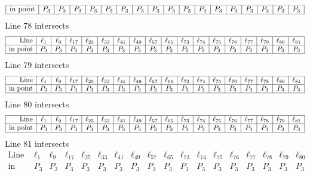 \documentclass{article}
\begin{document}
{$$\begin{array}{|r*{17}{|c}|}
\hline
\mbox{in point}  & P_{3} & P_{3} & P_{3} & P_{3} & P_{3} & P_{3} & P_{3} & P_{3} & P_{3} & P_{3} & P_{3} & P_{3} & P_{3} & P_{3} & P_{3} & P_{3} & P_{3}\\
\hline
\end{array}
$$
Line 78 intersects 
$$
\begin{array}{|r*{17}{|c}|}
\hline
\mbox{Line}  & \ell_{1} & \ell_{9} & \ell_{17} & \ell_{25} & \ell_{33} & \ell_{41} & \ell_{49} & \ell_{57} & \ell_{65} & \ell_{73} & \ell_{74} & \ell_{75} & \ell_{76} & \ell_{77} & \ell_{79} & \ell_{80} & \ell_{81}\\
\hline
\mbox{in point}  & P_{3} & P_{3} & P_{3} & P_{3} & P_{3} & P_{3} & P_{3} & P_{3} & P_{3} & P_{3} & P_{3} & P_{3} & P_{3} & P_{3} & P_{3} & P_{3} & P_{3}\\
\hline
\end{array}
$$
Line 79 intersects 
$$
\begin{array}{|r*{17}{|c}|}
\hline
\mbox{Line}  & \ell_{1} & \ell_{9} & \ell_{17} & \ell_{25} & \ell_{33} & \ell_{41} & \ell_{49} & \ell_{57} & \ell_{65} & \ell_{73} & \ell_{74} & \ell_{75} & \ell_{76} & \ell_{77} & \ell_{78} & \ell_{80} & \ell_{81}\\
\hline
\mbox{in point}  & P_{3} & P_{3} & P_{3} & P_{3} & P_{3} & P_{3} & P_{3} & P_{3} & P_{3} & P_{3} & P_{3} & P_{3} & P_{3} & P_{3} & P_{3} & P_{3} & P_{3}\\
\hline
\end{array}
$$
Line 80 intersects 
$$
\begin{array}{|r*{17}{|c}|}
\hline
\mbox{Line}  & \ell_{1} & \ell_{9} & \ell_{17} & \ell_{25} & \ell_{33} & \ell_{41} & \ell_{49} & \ell_{57} & \ell_{65} & \ell_{73} & \ell_{74} & \ell_{75} & \ell_{76} & \ell_{77} & \ell_{78} & \ell_{79} & \ell_{81}\\
\hline
\mbox{in point}  & P_{3} & P_{3} & P_{3} & P_{3} & P_{3} & P_{3} & P_{3} & P_{3} & P_{3} & P_{3} & P_{3} & P_{3} & P_{3} & P_{3} & P_{3} & P_{3} & P_{3}\\
\hline
\end{array}
$$
Line 81 intersects 
$$
\begin{array}{|r*{17}{|c}|}
\hline
\mbox{Line}  & \ell_{1} & \ell_{9} & \ell_{17} & \ell_{25} & \ell_{33} & \ell_{41} & \ell_{49} & \ell_{57} & \ell_{65} & \ell_{73} & \ell_{74} & \ell_{75} & \ell_{76} & \ell_{77} & \ell_{78} & \ell_{79} & \ell_{80}\\
\hline
\mbox{in point}  & P_{3} & P_{3} & P_{3} & P_{3} & P_{3} & P_{3} & P_{3} & P_{3} & P_{3} & P_{3} & P_{3} & P_{3} & P_{3} & P_{3} & P_{3} & P_{3} & P_{3}\\

\end{array}$$}
\end{document}
